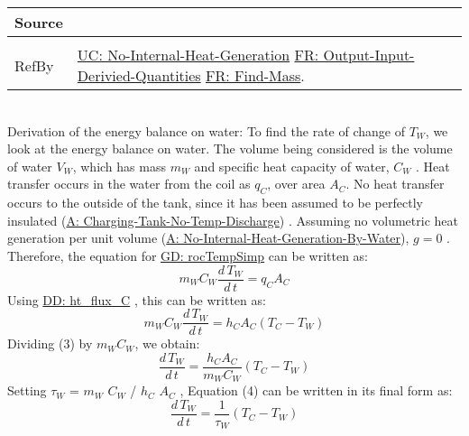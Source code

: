 \documentclass[12pt]{article}
\begin{document}
\begin{minipage}{\textwidth}
\begin{tabular}{p{} p{}}
                                                                                                   Source & \cite{koothoor2013}
                                                                                                            \\ \midrule \\
                                                                                                            RefBy & \hyperref[unlikeChgNIHG]{UC: No-Internal-Heat-Generation} \hyperref[reqOIDQ]{FR: Output-Input-Derivied-Quantities} \hyperref[reqFM]{FR: Find-Mass}.
\\ \bottomrule \end{tabular}
\end{minipage}\\
Derivation of the energy balance on water:
To find the rate of change of ${T_{W}}$, we look at the energy balance on water. The volume being considered is the volume of water ${V_{W}}$, which has mass ${m_{W}}$ and specific heat capacity of water, ${C_{W}}$ . Heat transfer occurs in the water from the coil as ${q_{C}}$, over area ${A_{C}}$. No heat transfer occurs to the outside of the tank, since it has been assumed to be perfectly insulated (\hyperref[A:Charging-Tank-No-Temp-Discharge]{A: Charging-Tank-No-Temp-Discharge}) . Assuming no volumetric heat generation per unit volume (\hyperref[A:No-Internal-Heat-Generation-By-Water]{A: No-Internal-Heat-Generation-By-Water}), $g=0$ . Therefore, the equation for \hyperref[GD:rocTempSimp]{GD: rocTempSimp} can be written as:
\begin{displaymath}
{m_{W}} {C_{W}} \frac{d\,{T_{W}}}{d\,t}={q_{C}} {A_{C}}
\end{displaymath}
Using \hyperref[DD:ht.flux.C]{DD: ht\_flux\_C} , this can be written as:
\begin{displaymath}
{m_{W}} {C_{W}} \frac{d\,{T_{W}}}{d\,t}={h_{C}} {A_{C}} \left({T_{C}}-{T_{W}}\right)
\end{displaymath}
Dividing (3) by ${m_{W}} {C_{W}}$, we obtain:
\begin{displaymath}
\frac{d\,{T_{W}}}{d\,t}=\frac{{h_{C}} {A_{C}}}{{m_{W}} {C_{W}}} \left({T_{C}}-{T_{W}}\right)
\end{displaymath}
Setting ${τ_{W}}$ = ${m_{W}}$ ${C_{W}}$ / ${h_{C}}$ ${A_{C}}$ , Equation (4) can be written in its final form as:
\begin{displaymath}
\frac{d\,{T_{W}}}{d\,t}=\frac{1}{{τ_{W}}} \left({T_{C}}-{T_{W}}\right)
\end{displaymath}
~\newline
\end{document}
